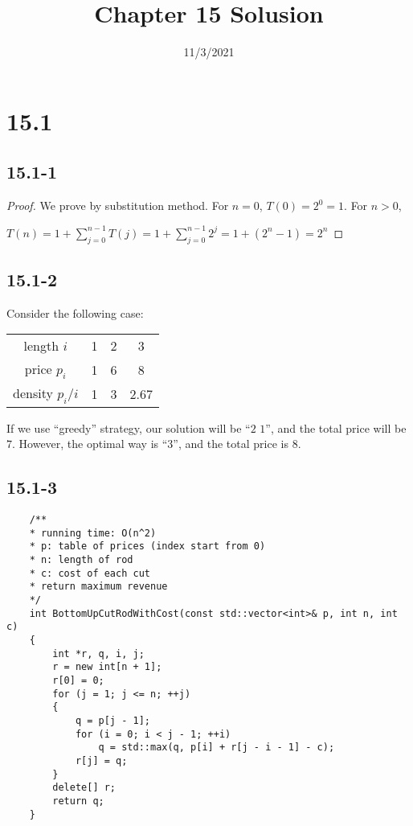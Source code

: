 

\title{Chapter 15 Solusion}
\date{11/3/2021}


\maketitle

\section*{15.1}

\subsection*{15.1-1}

\begin{proof}
    We prove by substitution method.
    For $n=0$, $T(0)=2^0=1$.
    For $n>0$,

    $T(n)=1+\sum\limits_{j=0}^{n-1}T(j)
    =1+\sum\limits_{j=0}^{n-1}2^j=1+(2^n-1)=2^n$
\end{proof}

\subsection*{15.1-2}

Consider the following case:

\begin{tabular}{c||c|c|c}
    length $i$      & 1 & 2 & 3 \\
    price $p_i$     & 1 & 6 & 8 \\
    density $p_i/i$ & 1 & 3 & 2.67
\end{tabular}

\noindent
If we use ``greedy'' strategy, our solution will be ``$2$ $1$'',
and the total price will be $7$.
However, the optimal way is ``$3$'', and the total price is $8$.

\subsection*{15.1-3}

\begin{verbatim}
    /**
    * running time: O(n^2)
    * p: table of prices (index start from 0)
    * n: length of rod
    * c: cost of each cut
    * return maximum revenue
    */
    int BottomUpCutRodWithCost(const std::vector<int>& p, int n, int c)
    {
        int *r, q, i, j;
        r = new int[n + 1];
        r[0] = 0;
        for (j = 1; j <= n; ++j)
        {
            q = p[j - 1];
            for (i = 0; i < j - 1; ++i)
                q = std::max(q, p[i] + r[j - i - 1] - c);
            r[j] = q;
        }
        delete[] r;
        return q;
    }
\end{verbatim}

